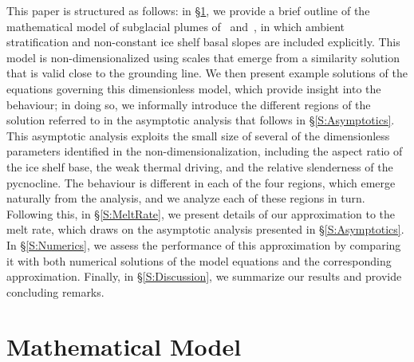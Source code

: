 \documentclass[openacc]{rsproca_new}%
\begin{document}
This paper is structured as follows: in \S\ref{S:Model}, we provide a brief outline of the mathematical model of subglacial plumes of~\cite{Jenkins1991JGeophysResOceans} and~\cite{Jenkins2011JPhysOcean}, in which ambient stratification and non-constant ice shelf basal slopes are included explicitly. This model is non-dimensionalized using scales that emerge from a similarity solution that is valid close to the grounding line. We then present example solutions of the equations governing this dimensionless model, which provide insight into the behaviour; in doing so, we informally introduce the different regions of the solution referred to in the asymptotic analysis that follows in \S\ref{S:Asymptotics}. This asymptotic analysis exploits the small size of several of the dimensionless parameters identified in the non-dimensionalization, including the aspect ratio of the ice shelf base, the weak thermal driving, and the relative slenderness of the pycnocline. The behaviour is different in each of the four regions, which emerge naturally from the analysis, and we analyze each of these regions in turn. Following this, in \S\ref{S:MeltRate}, we present details of our approximation to the melt rate, which draws on the asymptotic analysis presented in \S\ref{S:Asymptotics}. In \S\ref{S:Numerics}, we assess the performance of this approximation by comparing it with both numerical solutions of the model equations and the corresponding~\cite{Lazeroms2019JPhysOcean} approximation. Finally, in \S\ref{S:Discussion}, we summarize our results and provide concluding remarks. 


\section{Mathematical Model}\label{S:Model}
\end{document}

